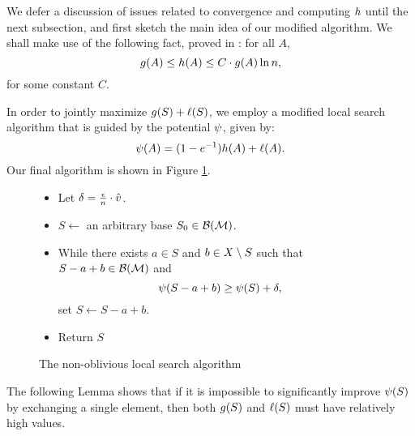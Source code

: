 \documentclass{article}
\theoremstyle{definition}
\begin{document}
We defer a discussion of issues related to convergence and computing $h$ until the next subsection, and first sketch the main idea of our modified algorithm.  We shall make use of the following fact, proved in \cite[Lemma 4.4, p.\ 524-5]{Filmus2014}: for all $A$,
$$g(A) \le h(A)\le C \cdot g(A) \ln n,$$ for some constant $C$.

In order to jointly maximize $g(S) + \ell(S)$, we employ a modified local search algorithm that is guided by the potential $\psi$, given by:
\begin{equation*}
\psi(A) = (1 - e^{-1})h(A) + \ell(A).
\end{equation*}
Our final algorithm is shown in Figure \ref{fig:non-oblv-alg}.

\begin{figure}
\begin{framed}
\begin{itemize}[itemsep=0ex, topsep=0.5ex]
\item Let $\delta = \frac{\epsilon}{n}\cdot\hat{v}$.
\item $S \gets $ an arbitrary base $S_{0} \in \mathcal{B}(\mathcal{M})$.
\item  While there exists $a \in S$ and $b \in X \setminus S$
such that $S - a + b \in \mathcal{B}(\mathcal{M})$ and $$\psi(S - a + b) \ge \psi(S) + \delta,$$ set $S \gets S - a + b$.
\item Return $S$
\end{itemize}
\end{framed}
\caption{The non-oblivious local search algorithm}
\label{fig:non-oblv-alg}
\end{figure}

The following Lemma shows that if it is impossible to significantly improve $\psi(S)$ by exchanging a single element, then both $g(S)$ and $\ell(S)$ must have relatively high values.
\end{document}
